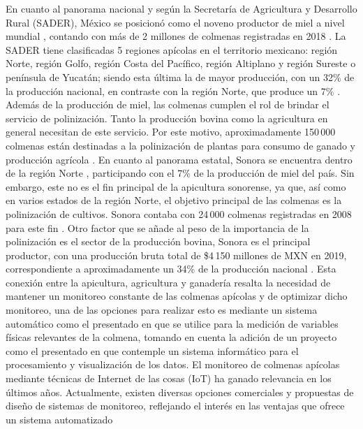 En cuanto al panorama nacional y según la Secretaría de Agricultura y Desarrollo Rural (SADER), México se posicionó como el noveno productor de miel a nivel mundial \cite{SecretariaDeAgriculturaDesarrolloRural}, contando con más de 2 millones de colmenas registradas en 2018 \cite{SecretariaDeAgriculturaDesarrolloRural2022}.
La SADER tiene clasificadas 5 regiones apícolas en el territorio mexicano: región Norte, región Golfo, región Costa del Pacífico, región Altiplano y región Sureste o península de Yucatán; siendo esta última la de mayor producción, con un 32\% de la producción nacional, en contraste con la región Norte, que produce un 7\% \cite{SecretariaDeAgriculturaDesarrolloRural2022}.
Además de la producción de miel, las colmenas cumplen el rol de brindar el servicio de polinización. Tanto la producción bovina como la agricultura en general necesitan de este servicio. Por este motivo, aproximadamente 150\,000 colmenas están destinadas a la polinización de plantas para consumo de ganado y producción agrícola \cite{SecretariaDeAgriculturaDesarrolloRural2022}.
En cuanto al panorama estatal, Sonora se encuentra dentro de la región Norte \cite{coordinacion_general_de_ganaderia_2015}, participando con el 7\% de la producción de miel del país. Sin embargo, este no es el fin principal de la apicultura sonorense, ya que, así como en varios estados de la región Norte, el objetivo principal de las colmenas es la polinización de cultivos. Sonora contaba con 24\,000 colmenas registradas en 2008 para este fin \cite{coordinacion_general_de_ganaderia_2015}.
Otro factor que se añade al peso de la importancia de la polinización es el sector de la producción bovina, Sonora es el principal productor, con una producción bruta total de \$4\,150 millones de MXN en 2019, correspondiente a aproximadamente un 34\% de la producción nacional \cite{data_mexico_2023b}.
Esta conexión entre la apicultura, agricultura y ganadería resalta la necesidad de mantener un monitoreo constante de las colmenas apícolas y de optimizar dicho monitoreo, una de las opciones para realizar esto es mediante un sistema automático como el presentado en \cite{chen_chien_hsu_jing_lin_lin_2020} que se utilice para la medición de variables físicas relevantes de la colmena, tomando en cuenta la adición de un proyecto como el presentado en \cite{marina_lara_meza_2023} que contemple un sistema informático para el procesamiento y visualización de los datos.
El monitoreo de colmenas apícolas mediante técnicas de Internet de las cosas (IoT) ha ganado relevancia en los últimos años. Actualmente, existen diversas opciones comerciales y propuestas de diseño de sistemas de monitoreo, reflejando el interés en las ventajas que ofrece un sistema automatizado
